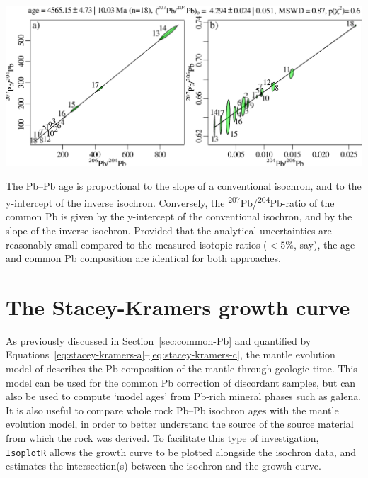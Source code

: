 \begin{refsection}
\begin{center}
\includegraphics[width=.9\linewidth]{../figures/PbPb.pdf}\\ 
\end{center}

The Pb--Pb age is proportional to the slope of a conventional
isochron, and to the y-intercept of the inverse isochron. Conversely,
the \textsuperscript{207}Pb/\textsuperscript{204}Pb-ratio of the
common Pb is given by the y-intercept of the conventional isochron,
and by the slope of the inverse isochron. Provided that the analytical
uncertainties are reasonably small compared to the measured isotopic
ratios ($<5\%$, say), the age and common Pb composition are identical
for both approaches.

\section{The Stacey-Kramers growth curve}\label{sec:SKgrowth}

As previously discussed in Section~\ref{sec:common-Pb} and quantified
by Equations~\ref{eq:stacey-kramers-a}--\ref{eq:stacey-kramers-c}, the
mantle evolution model of \citet{stacey1975} describes the Pb
composition of the mantle through geologic time. This model can be
used for the common Pb correction of discordant samples, but can also
be used to compute `model ages' from Pb-rich mineral phases such as
galena. It is also useful to compare whole rock Pb--Pb isochron ages
with the mantle evolution model, in order to better understand the
source of the source material from which the rock was derived.  To
facilitate this type of investigation, \texttt{IsoplotR} allows the
\citet{stacey1975} growth curve to be plotted alongside the isochron
data, and estimates the intersection(s) between the isochron and the
growth curve.


\end{refsection}
